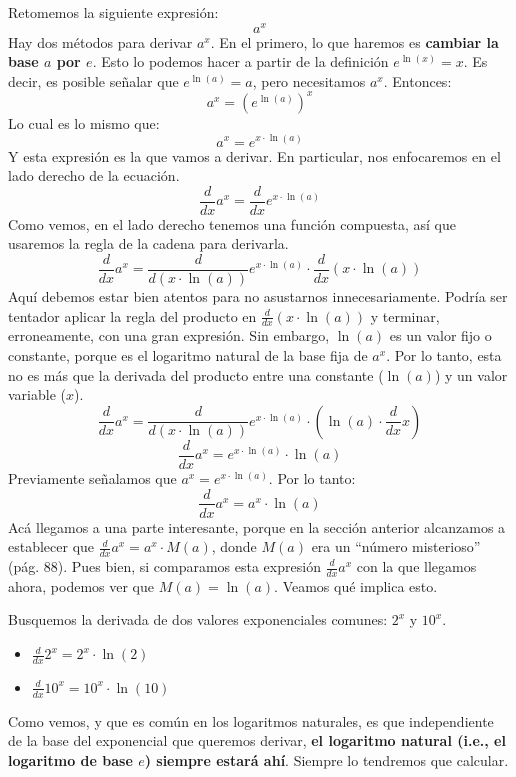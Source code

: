 \documentclass[12pt]{article}
\begin{document}
Retomemos la siguiente expresión:
\[a^{x}\]
Hay dos métodos para derivar $a^{x}$. En el primero, lo que haremos es \textbf{cambiar la base $a$ por $e$}. Esto lo podemos hacer a partir de la definición $e^{\ln(x)} = x$. Es decir, es posible señalar que $e^{\ln(a)} = a$, pero necesitamos $a^{x}$. Entonces:
\[a^{x} = (e^{\ln(a)})^{x}\]
Lo cual es lo mismo que:
\[a^{x} = e^{x \cdot \ln(a)}\]
Y esta expresión es la que vamos a derivar. En particular, nos enfocaremos en el lado derecho de la ecuación.
\[\frac{d}{dx} a^{x} = \frac{d}{dx} e^{x \cdot \ln(a)}\]
Como vemos, en el lado derecho tenemos una función compuesta, así que usaremos la regla de la cadena para derivarla.
\[\frac{d}{dx} a^{x} = \frac{d}{d(x \cdot \ln(a))} e^{x \cdot \ln(a)} \cdot \frac{d}{dx} (x \cdot \ln(a))\]
Aquí debemos estar bien atentos para no asustarnos innecesariamente. Podría ser tentador aplicar la regla del producto en $\frac{d}{dx} (x \cdot \ln(a))$ y terminar, erroneamente, con una gran expresión. Sin embargo, $\ln(a)$ es un valor fijo o constante, porque es el logaritmo natural de la base fija de $a^{x}$. Por lo tanto, esta no es más que la derivada del producto entre una constante ($\ln(a)$) y un valor variable ($x$).
\[\frac{d}{dx} a^{x} = \frac{d}{d(x \cdot \ln(a))} e^{x \cdot \ln(a)} \cdot \left(\ln(a) \cdot \frac{d}{dx} x \right)\]
\[\frac{d}{dx} a^{x} = e^{x \cdot \ln(a)} \cdot \ln(a)\]
Previamente señalamos que $a^{x} = e^{x \cdot \ln(a)}$. Por lo tanto:
\[\frac{d}{dx} a^{x} = a^{x} \cdot \ln(a)\]
Acá llegamos a una parte interesante, porque en la sección anterior alcanzamos a establecer que $\frac{d}{dx} a^{x} = a^{x} \cdot M(a)$, donde $M(a)$ era un ``número misterioso'' (pág. 88). Pues bien, si comparamos esta expresión $\frac{d}{dx} a^{x}$ con la que llegamos ahora, podemos ver que $M(a) = \ln(a)$. Veamos qué implica esto.

Busquemos la derivada de dos valores exponenciales comunes: $2^{x}$ y $10^{x}$.

\begin{itemize}
\item $\frac{d}{dx} 2^{x} = 2^{x} \cdot \ln(2)$
\item $\frac{d}{dx} 10^{x} = 10^{x} \cdot \ln(10)$
\end{itemize}

Como vemos, y que es común en los logaritmos naturales, es que independiente de la base del exponencial que queremos derivar, \textbf{el logaritmo natural (i.e., el logaritmo de base $e$) siempre estará ahí}. Siempre lo tendremos que calcular.
\end{document}
